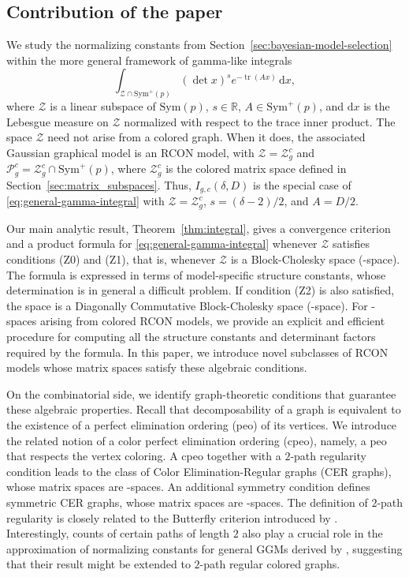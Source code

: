 \documentclass[12pt]{amsart}
\theoremstyle{plain}
\theoremstyle{definition}
\theoremstyle{remark}
\newcommand{\1}{\mathbf{1}}
\newcommand{\dd}{\mathrm{d}}
\newcommand{\tr}{\operatorname{tr}}
\begin{document}
\subsection{Contribution of the paper}
We study the normalizing constants from Section~\ref{sec:bayesian-model-selection} within the more general framework of gamma-like integrals
\begin{equation}\label{eq:general-gamma-integral}
\int_{\mathcal{Z}\cap\mathrm{Sym}^+(p)}
(\det x)^s e^{-\tr(Ax)}\,\dd x,
\end{equation}
where $\mathcal{Z}$ is a linear subspace of $\mathrm{Sym}(p)$, $s\in\mathbb{R}$, $A\in\mathrm{Sym}^+(p)$, and $\dd x$ is the Lebesgue measure on $\mathcal{Z}$ normalized with respect to the trace inner product. The space $\mathcal{Z}$ need not arise from a colored graph. When it does, the associated Gaussian graphical model is an RCON model, with $\mathcal{Z}=\mathcal{Z}_g^c$ and $\mathcal{P}_g^c=\mathcal{Z}_g^c\cap\mathrm{Sym}^+(p)$, where $\mathcal{Z}_g^c$ is the colored matrix space defined in Section~\ref{sec:matrix_subspaces}. Thus, $I_{g,c}(\delta,D)$ is the special case of \eqref{eq:general-gamma-integral} with $\mathcal{Z}=\mathcal{Z}_g^c$, $s=(\delta-2)/2$, and $A=D/2$.

Our main analytic result, Theorem~\ref{thm:integral}, gives a convergence criterion and a product formula for \eqref{eq:general-gamma-integral} whenever $\mathcal{Z}$ satisfies conditions (Z0) and (Z1), that is, whenever $\mathcal{Z}$ is a Block-Cholesky space (\BC-space). The formula is expressed in terms of model-specific structure constants, whose determination is in general a difficult problem. If condition (Z2) is also satisfied, the space is a Diagonally Commutative Block-Cholesky space (\cBC-space). For \cBC-spaces arising from colored RCON models, we provide an explicit and efficient procedure for computing all the structure constants and determinant factors required by the formula. In this paper, we introduce novel subclasses of RCON models whose matrix spaces satisfy these algebraic conditions.

On the combinatorial side, we identify graph-theoretic conditions that guarantee these algebraic properties. Recall that decomposability of a graph is equivalent to the existence of a perfect elimination ordering (peo) of its vertices. We introduce the related notion of a color perfect elimination ordering (cpeo), namely, a peo that respects the vertex coloring. A cpeo together with a $2$-path regularity condition leads to the class of Color Elimination-Regular graphs (CER graphs), whose matrix spaces are \BC-spaces. An additional symmetry condition defines symmetric CER graphs, whose matrix spaces are \cBC-spaces. The definition of $2$-path regularity is closely related to the Butterfly criterion introduced by \citet{Seigal23}. Interestingly, counts of certain paths of length $2$ also play a crucial role in the approximation of normalizing constants for general GGMs derived by \citet[Theorem~1]{MML23}, suggesting that their result might be extended to $2$-path regular colored graphs.
\end{document}
